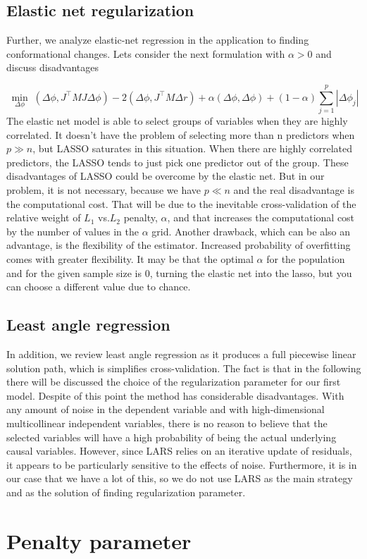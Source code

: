 \documentclass[12pt,twoside]{article}
\begin{document}
 \subsection{\small{Elastic net regularization}}
Further, we analyze elastic-net regression in the application to finding conformational changes.  Lets consider the next formulation with  $\alpha > 0$ and discuss disadvantages

$$\min_{\Delta \phi} \; (\Delta \phi, J^{\top}MJ \Delta \phi)-2(\Delta \phi, J^{\top}M\Delta r) + \alpha(\Delta \phi, \Delta \phi) + (1-\alpha)\sum\limits_{j=1}^{p} |\Delta\phi_j|$$
The elastic net model is able to select groups of variables when they are highly correlated. It doesn't have the problem of selecting more than n predictors when $p \gg n$, but LASSO saturates in this situation. When there are highly correlated predictors, the LASSO tends to just pick one predictor out of the group. These disadvantages of LASSO could be overcome by the elastic net. But in our problem, it is not necessary, because we have $p \ll n$ and the real disadvantage is the computational cost. That will be due to the inevitable cross-validation of the relative weight of $L_1$ vs.$L_2$ penalty, $\alpha$, and that increases the computational cost by the number of values in the $\alpha$ grid. Another drawback, which can be also an advantage, is the flexibility of the estimator. Increased probability of overfitting comes with greater flexibility. It may be that the optimal $\alpha$ for the population and for the given sample size is 0, turning the elastic net into the lasso, but you can choose a different value due to chance\cite{RePEc:bla:jorssb:v:67:y:2005:i:5:p:768-768}. 

 \subsection{\small{Least angle regression }}
In addition, we review least angle regression as it produces a full piecewise linear solution path, which is simplifies cross-validation. The fact is that in the following there will be discussed the choice of the regularization parameter for our first model. Despite of this point the method has considerable disadvantages. With any amount of noise in the dependent variable and with high-dimensional multicollinear independent variables, there is no reason to believe that the selected variables will have a high probability of being the actual underlying causal variables. However, since LARS relies on an iterative update of residuals, it appears to be particularly sensitive to the effects of noise\cite{efron2004least}.  Furthermore, it is in our case that we have a lot of this, so we do not use LARS as the main strategy and as the solution of finding regularization parameter. 

 \section{Penalty parameter}
 
 
        
\end{document}
